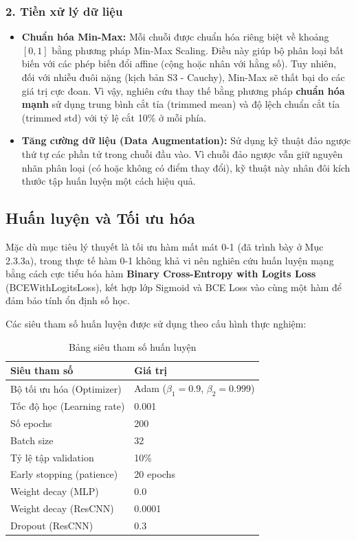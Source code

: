 \subsubsection*{2. Tiền xử lý dữ liệu}
\begin{itemize}
    \item \textbf{Chuẩn hóa Min-Max:} Mỗi chuỗi được chuẩn hóa riêng biệt về khoảng $[0, 1]$ bằng phương pháp Min-Max Scaling. 
    Điều này giúp bộ phân loại bất biến với các phép biến đổi affine (cộng hoặc nhân với hằng số). 
    Tuy nhiên, đối với nhiễu đuôi nặng (kịch bản S3 - Cauchy), Min-Max sẽ thất bại do các giá trị cực đoan. 
    Vì vậy, nghiên cứu thay thế bằng phương pháp \textbf{chuẩn hóa mạnh} sử dụng trung bình cắt tỉa (trimmed mean)
    và độ lệch chuẩn cắt tỉa (trimmed std) với tỷ lệ cắt 10\% ở mỗi phía.
    \item \textbf{Tăng cường dữ liệu (Data Augmentation):} Sử dụng kỹ thuật đảo ngược thứ tự các phần tử trong chuỗi đầu vào. 
    Vì chuỗi đảo ngược vẫn giữ nguyên nhãn phân loại (có hoặc không có điểm thay đổi), 
    kỹ thuật này nhân đôi kích thước tập huấn luyện một cách hiệu quả.
\end{itemize}

\subsection{Huấn luyện và Tối ưu hóa}

Mặc dù mục tiêu lý thuyết là tối ưu hàm mất mát 0-1 (đã trình bày ở Mục 2.3.3a), 
trong thực tế hàm 0-1 không khả vi nên nghiên cứu huấn luyện mạng bằng cách cực tiểu hóa hàm 
\textbf{Binary Cross-Entropy with Logits Loss} (BCEWithLogitsLoss), 
kết hợp lớp Sigmoid và BCE Loss vào cùng một hàm để đảm bảo tính ổn định số học.

Các siêu tham số huấn luyện được sử dụng theo cấu hình thực nghiệm:
\begin{table}[ht]
    \centering
    \renewcommand{\arraystretch}{1.3}
    \begin{tabular}{|l|l|}
        \hline
        \textbf{Siêu tham số} & \textbf{Giá trị} \\
        \hline
        Bộ tối ưu hóa (Optimizer) & Adam ($\beta_1 = 0.9$, $\beta_2 = 0.999$) \\
        \hline
        Tốc độ học (Learning rate) & 0.001 \\
        \hline
        Số epochs & 200 \\
        \hline
        Batch size & 32 \\
        \hline
        Tỷ lệ tập validation & 10\% \\
        \hline
        Early stopping (patience) & 20 epochs \\
        \hline
        Weight decay (MLP) & 0.0 \\
        \hline
        Weight decay (ResCNN) & 0.0001 \\
        \hline
        Dropout (ResCNN) & 0.3 \\
        \hline
    \end{tabular}
    \caption{Bảng siêu tham số huấn luyện}
    \label{tab:hyperparams}
\end{table}

